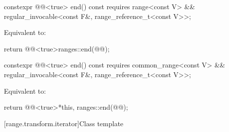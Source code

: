 %
\begin{itemdecl}
constexpr @@<true> end() const
  requires range<const V> &&
           regular_invocable<const F&, range_reference_t<const V>>;
\end{itemdecl}

\begin{itemdescr}
\pnum
\effects
Equivalent to:
\begin{codeblock}
return @@<true>{ranges::end(@@)};
\end{codeblock}
\end{itemdescr}

%
\begin{itemdecl}
constexpr @@<true> end() const
  requires common_range<const V> &&
           regular_invocable<const F&, range_reference_t<const V>>;
\end{itemdecl}

\begin{itemdescr}
\pnum
\effects
Equivalent to:
\begin{codeblock}
return @@<true>{*this, ranges::end(@@)};
\end{codeblock}
\end{itemdescr}

[range.transform.iterator]{Class template }

